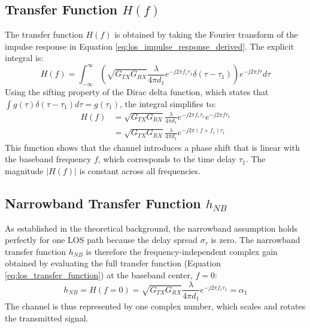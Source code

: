 \subsection{Transfer Function $H(f)$}
The transfer function $H(f)$ is obtained by taking the Fourier transform of the impulse response in Equation \ref{eq:los_impulse_response_derived}. The explicit integral is:
\begin{equation}
	H(f) = \int_{-\infty}^{\infty} \left( \sqrt{G_{TX}G_{RX}} \frac{\lambda}{4\pi d_1} e^{-j2\pi f_c \tau_1} \delta(\tau - \tau_1) \right) e^{-j2\pi f \tau} d\tau
\end{equation}
Using the sifting property of the Dirac delta function, which states that $\int g(\tau)\delta(\tau - \tau_1)d\tau = g(\tau_1)$, the integral simplifies to:
\begin{align}
	H(f) &= \sqrt{G_{TX}G_{RX}} \frac{\lambda}{4\pi d_1} e^{-j2\pi f_c \tau_1} e^{-j2\pi f \tau_1} \\
	&= \sqrt{G_{TX}G_{RX}} \frac{\lambda}{4\pi d_1} e^{-j2\pi (f+f_c) \tau_1}
	\label{eq:los_transfer_function}
\end{align}
This function shows that the channel introduces a phase shift that is linear with the baseband frequency $f$, which corresponds to the time delay $\tau_1$. The magnitude $|H(f)|$ is constant across all frequencies.

\subsection{Narrowband Transfer Function $h_{NB}$}
As established in the theoretical background, the narrowband assumption holds perfectly for one LOS path because the delay spread $\sigma_\tau$ is zero. The narrowband transfer function $h_{NB}$ is therefore the frequency-independent complex gain obtained by evaluating the full transfer function (Equation \ref{eq:los_transfer_function}) at the baseband center, $f=0$:
\begin{equation}
	h_{NB} = H(f=0) = \sqrt{G_{TX}G_{RX}} \frac{\lambda}{4\pi d_1} e^{-j2\pi f_c \tau_1} = \alpha_1
	\label{eq:los_narrowband_tf}
\end{equation}
The channel is thus represented by one complex number, which scales and rotates the transmitted signal.

